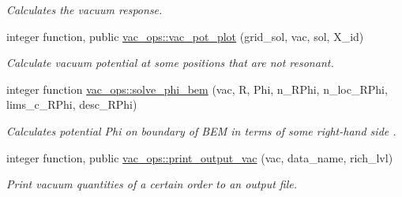 \begin{DoxyCompactItemize}
\begin{DoxyCompactList}\small\item\em Calculates the vacuum response. \end{DoxyCompactList}\item 
integer function, public \hyperlink{namespacevac__ops_a3a2a3aed45951aecef42197b82a5a6da}{vac\+\_\+ops\+::vac\+\_\+pot\+\_\+plot} (grid\+\_\+sol, vac, sol, X\+\_\+id)
\begin{DoxyCompactList}\small\item\em Calculate vacuum potential at some positions that are not resonant. \end{DoxyCompactList}\item 
integer function \hyperlink{namespacevac__ops_ace79efa50ae5a120e515164c99ce9582}{vac\+\_\+ops\+::solve\+\_\+phi\+\_\+bem} (vac, R, Phi, n\+\_\+\+R\+Phi, n\+\_\+loc\+\_\+\+R\+Phi, lims\+\_\+c\+\_\+\+R\+Phi, desc\+\_\+\+R\+Phi)
\begin{DoxyCompactList}\small\item\em Calculates potential {\ttfamily Phi} on boundary of B\+EM in terms of some right-\/hand side . \end{DoxyCompactList}\item 
integer function, public \hyperlink{namespacevac__ops_a78969bf43f80f0df3acf23c47edf7aff}{vac\+\_\+ops\+::print\+\_\+output\+\_\+vac} (vac, data\+\_\+name, rich\+\_\+lvl)
\begin{DoxyCompactList}\small\item\em Print vacuum quantities of a certain order to an output file. \end{DoxyCompactList}\end{DoxyCompactItemize}
